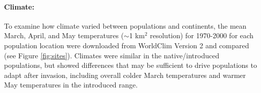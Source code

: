 \documentclass[11pt]{article}\usepackage[]{graphicx}\usepackage[]{color}
\begin{document}
	
	\paragraph{Climate:} 
	To examine how climate varied between populations and continents, the mean March, April, and May temperatures ($\sim$1 km$^2$ resolution) for 1970-2000 for each population location were downloaded from WorldClim Version 2 \parencite{Fick2017}  and compared (see Figure \ref{fig:sites}). Climates were similar in the native/introduced populations, but showed differences that may be sufficient to drive populations to adapt after invasion, including overall colder March temperatures and warmer May temperatures in the introduced range. %
	
\end{document}
